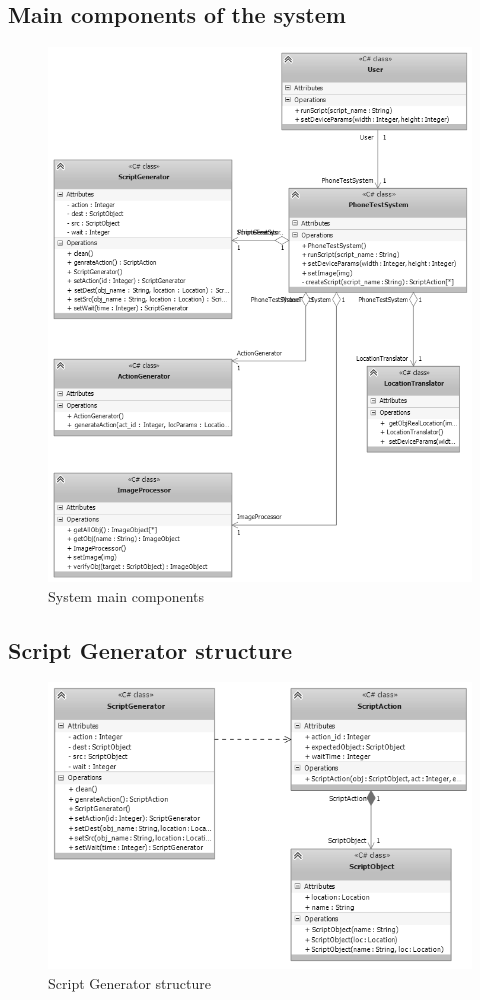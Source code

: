 \subsection{Main components of the system}
	\begin{figure}[H]
		\centering
		\includegraphics[scale=0.75]{Chapters/Fig/main_class.png}
		\caption{System main components}
		\label{fig:main_class}
	\end{figure}

\subsection{Script Generator structure}
	\begin{figure}[H]
		\centering
		\includegraphics[scale=0.75]{Chapters/Fig/script_gen.png}
		\caption{Script Generator structure}
		\label{fig:script_gen}
	\end{figure}

